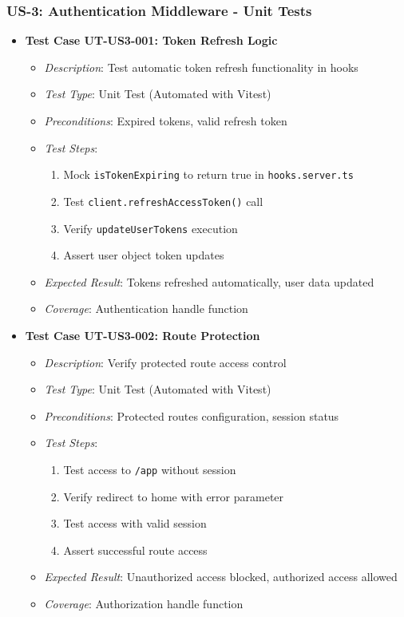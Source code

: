 \documentclass[12pt]{article}
\begin{document}
\subsubsection{US-3: Authentication Middleware - Unit Tests}
\begin{itemize}
  \item \textbf{Test Case UT-US3-001: Token Refresh Logic}
    \begin{itemize}
      \item \textit{Description}: Test automatic token refresh functionality in hooks
      \item \textit{Test Type}: Unit Test (Automated with Vitest)
      \item \textit{Preconditions}: Expired tokens, valid refresh token
      \item \textit{Test Steps}:
        \begin{enumerate}
          \item Mock \texttt{isTokenExpiring} to return true in \texttt{hooks.server.ts}
          \item Test \texttt{client.refreshAccessToken()} call
          \item Verify \texttt{updateUserTokens} execution
          \item Assert user object token updates
        \end{enumerate}
      \item \textit{Expected Result}: Tokens refreshed automatically, user data updated
      \item \textit{Coverage}: Authentication handle function
    \end{itemize}

  \item \textbf{Test Case UT-US3-002: Route Protection}
    \begin{itemize}
      \item \textit{Description}: Verify protected route access control
      \item \textit{Test Type}: Unit Test (Automated with Vitest)
      \item \textit{Preconditions}: Protected routes configuration, session status
      \item \textit{Test Steps}:
        \begin{enumerate}
          \item Test access to \texttt{/app} without session
          \item Verify redirect to home with error parameter
          \item Test access with valid session
          \item Assert successful route access
        \end{enumerate}
      \item \textit{Expected Result}: Unauthorized access blocked, authorized access allowed
      \item \textit{Coverage}: Authorization handle function
    \end{itemize}
\end{itemize}
\end{document}
